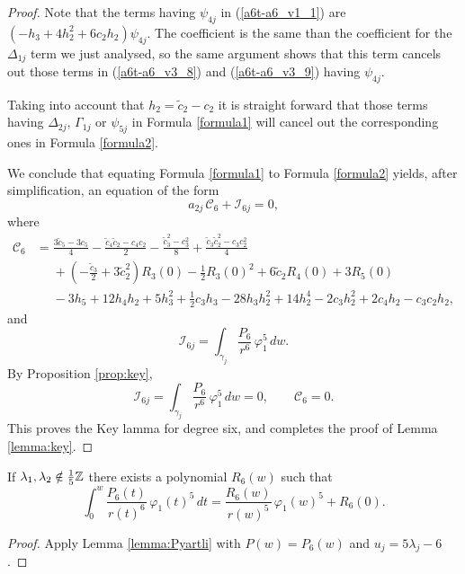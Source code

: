 \begin{proof}
Note that the terms having $\psi_{4j}$ in (\ref{a6t-a6_v1_1}) are $(-h_3+4h_2^2+6c_2h_2)\psi_{4j}$. The coefficient is the same than the coefficient for the $\Delta_{1j}$ term we just analysed, so the same argument shows that this term cancels out those terms in (\ref{a6t-a6_v3_8}) and (\ref{a6t-a6_v3_9}) having $\psi_{4j}$.

Taking into account that $h_2=\tilde{c}_2-c_2$ it is straight forward that those terms having $\Delta_{2j}$, $\Gamma_{1j}$ or $\psi_{5j}$ in Formula \ref{formula1} will cancel out the corresponding ones in Formula \ref{formula2}.

We conclude that equating Formula \ref{formula1} to Formula \ref{formula2} yields, after simplification, an equation of the form
\[ a_{2j}\,\mathcal{C}_6+\mathcal{I}_{6j}=0, \]
where
\begin{align*}
\mathcal{C}_6 &= \frac{3\tilde{c}_5-3c_5}{4}-\frac{\tilde{c}_4\tilde{c}_2-c_4c_2}{2}-\frac{\tilde{c}_3^2-c_3^2}{8}+\frac{\tilde{c}_3\tilde{c}_2^2-c_3c_2^2}{4} \\
&\phantom{=} +\left(-\frac{\tilde{c}_3}{2}+3\tilde{c}_2^2\right)R_3(0)-\frac{1}{2}R_3(0)^2+6\tilde{c}_2R_4(0)+3R_5(0)\\
&\phantom{=} -3h_5+12h_4h_2+5h_3^2+\frac{1}{2}c_3h_3-28h_3h_2^2+14h_2^4-2c_3h_2^2+2c_4h_2-c_3c_2h_2,
\end{align*}
and
\[ \mathcal{I}_{6j}=\int_{\gamma_j}\frac{P_6}{r^6}\,\varphi_1^5\,dw. \]
By Proposition \ref{prop:key},
\[ \mathcal{I}_{6j}=\int_{\gamma_j}\frac{P_6}{r^6}\,\varphi_1^5\,dw=0, \qquad \mathcal{C}_6=0. \]
This proves the Key lamma for degree six, and completes the proof of Lemma \ref{lemma:key}.
\end{proof}

\begin{proposition}\label{prop:R6}
If $\lambda_1,\lambda_2\notin\frac{1}{5}\mathbb{Z}$ there exists a polynomial $R_6(w)$ such that 
\[ \int_{0}^{w}\frac{P_6(t)}{r(t)^6}\,\varphi_1(t)^5\,dt=\frac{R_6(w)}{r(w)^5}\,\varphi_1(w)^5+R_6(0). \]
\end{proposition}

\begin{proof}
 Apply Lemma \ref{lemma:Pyartli} with $P(w)=P_6(w)$ and $u_j=5\lambda_j-6$.
\end{proof}











































